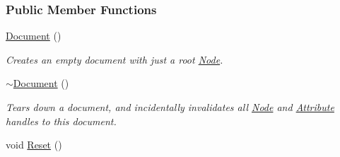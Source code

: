 \subsubsection*{Public Member Functions}
\begin{DoxyCompactItemize}
\item 
\hypertarget{classphys_1_1xml_1_1Document_ae1e779f0826bf3357ff77846155aad7d}{
\hyperlink{classphys_1_1xml_1_1Document_ae1e779f0826bf3357ff77846155aad7d}{Document} ()}
\label{classphys_1_1xml_1_1Document_ae1e779f0826bf3357ff77846155aad7d}

\begin{DoxyCompactList}\small\item\em Creates an empty document with just a root \hyperlink{classphys_1_1xml_1_1Node}{Node}. \item\end{DoxyCompactList}\item 
\hypertarget{classphys_1_1xml_1_1Document_a70013c2b670c4d4b5ee55d12e7c50be4}{
\hyperlink{classphys_1_1xml_1_1Document_a70013c2b670c4d4b5ee55d12e7c50be4}{$\sim$Document} ()}
\label{classphys_1_1xml_1_1Document_a70013c2b670c4d4b5ee55d12e7c50be4}

\begin{DoxyCompactList}\small\item\em Tears down a document, and incidentally invalidates all \hyperlink{classphys_1_1xml_1_1Node}{Node} and \hyperlink{classphys_1_1xml_1_1Attribute}{Attribute} handles to this document. \item\end{DoxyCompactList}\item 
\hypertarget{classphys_1_1xml_1_1Document_a9ab556271e4a1214ecb35ba6aef9e8e4}{
void \hyperlink{classphys_1_1xml_1_1Document_a9ab556271e4a1214ecb35ba6aef9e8e4}{Reset} ()}
\label{classphys_1_1xml_1_1Document_a9ab556271e4a1214ecb35ba6aef9e8e4}


\end{DoxyCompactItemize}
